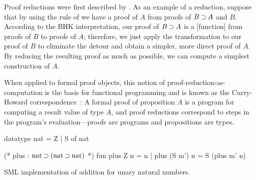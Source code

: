 Proof reductions were first described by \textcites{Gentzen:MZ35}{Prawitz:65}.
As an example of a reduction, suppose that by using the rule of  we have a proof of $A$ from proofs of $B \mathbin{\supset} A$ and $B$.
According to the \ac{BHK} interpretation, our proof of $B \mathbin{\supset} A$ is a [function] from proofs of $B$ to proofs of $A$; therefore,
we just apply the transformation to our proof of $B$ to eliminate the  detour and obtain a simpler, more direct proof of $A$.
By reducing the resulting proof as much as possible, we can compute a simplest construction of $A$.

When applied to formal proof objects, this notion of proof-reduction-as-computation is the basis for functional programming and is known as the Curry-Howard correspondence~\autocites{Howard:Curry80}{Martin-Lof:LMPS80}:
A formal proof of proposition $A$ is a program for computing a result value of type $A$, and proof reductions correspond to steps in the program's evaluation---proofs are programs and propositions are types.

\begin{listing}[!t]
  \begin{pyglist}[language=sml, gobble=4, texcl=true]
    datatype nat = Z | S of nat
  
    (* plus : $\text{nat} \imp (\text{nat} \imp \text{nat})$ *) 
    fun plus Z n = n
      | plus (S m') n = S (plus m' n)
  \end{pyglist}
  \caption{\ac{SML} implementation of addition for unary natural numbers.\label{lst:smlplus}}
\end{listing}

